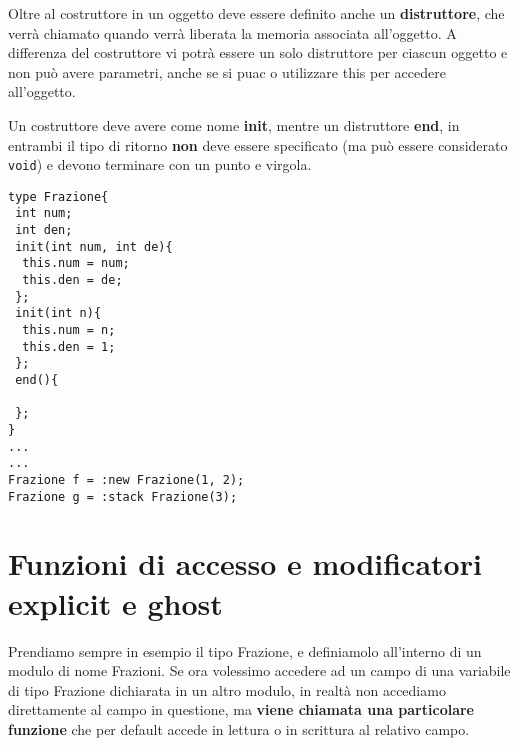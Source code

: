\documentclass[10pt]{book}%
\newcommand{\ac}[1]{\`{#1}}
\newcommand{\code}[1]{\texttt{#1}}
\renewcommand{\emph}[1]{\textbf{#1}}
\newenvironment{codeenv}{
\begin{mdframed}[backgroundcolor=black!20,topline=false,leftline=false,rightline=false,bottomline=false]
}
{\end{mdframed}}
\begin{document}
Oltre al costruttore in un oggetto deve essere definito anche un \emph{distruttore}, che verr\ac a chiamato quando verr\ac a liberata la memoria associata all'oggetto. A differenza del costruttore vi potr\ac a essere un solo distruttore per ciascun oggetto e non pu\ac o avere parametri, anche se si puac o utilizzare this per accedere all'oggetto.

Un costruttore deve avere come nome \emph{init}, mentre un distruttore \emph{end}, in entrambi il tipo di ritorno \emph{non} deve essere specificato (ma pu\ac o essere considerato \code{void}) e devono terminare con un punto e virgola.
\begin{codeenv}
\begin{verbatim}
type Frazione{
 int num;
 int den;
 init(int num, int de){
  this.num = num;
  this.den = de;
 };
 init(int n){
  this.num = n;
  this.den = 1;
 };
 end(){
 
 };
}
...
...
Frazione f = :new Frazione(1, 2);
Frazione g = :stack Frazione(3);
\end{verbatim}
\end{codeenv}

\section{Funzioni di accesso e modificatori explicit e ghost}
Prendiamo sempre in esempio il tipo Frazione, e definiamolo all'interno di un modulo di nome Frazioni. Se ora volessimo accedere ad un campo di una variabile di tipo Frazione dichiarata in un altro modulo, in realt\ac a non accediamo direttamente al campo in questione, ma \emph{viene chiamata una particolare funzione} che per default accede in lettura o in scrittura al relativo campo.
\end{document}
